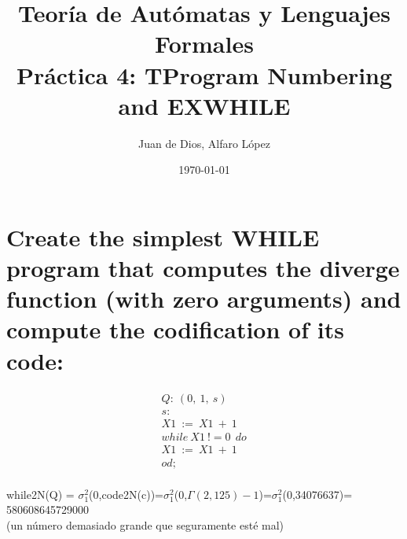 \documentclass[fleqn, 10pt]{article}
\title{Teoría de Autómatas y Lenguajes Formales\\[.4\baselineskip]Práctica 4: TProgram Numbering and EXWHILE}
\author{Juan de Dios, Alfaro López}
\date{\today}
\theoremstyle{plain}
\theoremstyle{definition}
\begin{document}
\maketitle

\section{Create the simplest WHILE program that computes the diverge function (with
zero arguments) and compute the codification of its code:}

\begin{ceqn}	%
    \begin{align*} %
    Q: \ (0,\ 1, \ s) \ \ \ \ \ \ \ \ \\
    s: \ \ \ \ \ \ \ \ \ \ \ \  \ \ \ \ \ \ \ \ \ \ \\
    X1\ := \ X1 \ + \ 1 \ \ \  \\
    while \ X1\ != 0\  \ do \\
    X1\ := \ X1 \ + \ 1 \\
    od; \ \ \ \ \ \ \ \ \ \ \ \ \ \ \ \ \ \ \ \ \  \\
	\end{align*} 
\end{ceqn}



while2N(Q) = $\sigma^2_1$(0,code2N(c))=$\sigma^2_1$(0,$\Gamma(2,125)-1$)=$\sigma^2_1$(0,34076637)= 580608645729000\\ (un número demasiado grande que seguramente esté mal)
\end{document}
